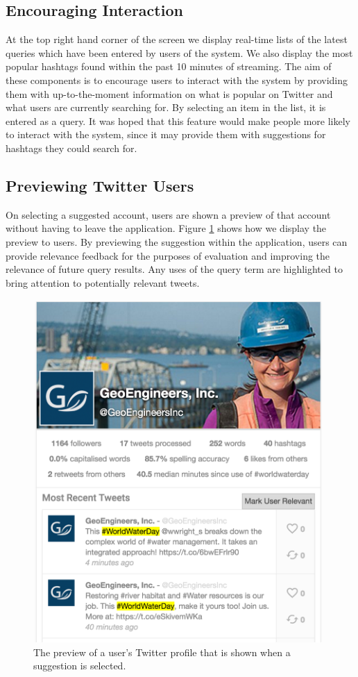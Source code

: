 \documentclass{l4proj}
\begin{document}
        \subsection{Encouraging Interaction}
        At the top right hand corner of the screen we display real-time lists of the latest queries which have been entered by users of the system. We also display the most popular hashtags found within the past 10 minutes of streaming. The aim of these components is to encourage users to interact with the system by providing them with up-to-the-moment information on what is popular on Twitter and what users are currently searching for. By selecting an item in the list, it is entered as a query. It was hoped that this feature would make people more likely to interact with the system, since it may provide them with suggestions for hashtags they could search for.
        
        \subsection{Previewing Twitter Users}
        On selecting a suggested account, users are shown a preview of that account without having to leave the application. Figure \ref{userpreview} shows how we display the preview to users. By previewing the suggestion within the application, users can provide relevance feedback for the purposes of evaluation and improving the relevance of future query results. Any uses of the query term are highlighted to bring attention to potentially relevant tweets.
        
\begin{figure}
\centering
\includegraphics[scale=0.5]{userpreview.png}
\caption{The preview of a user's Twitter profile that is shown when a suggestion is selected.}
\label{userpreview}
\end{figure}         
        
\end{document}
